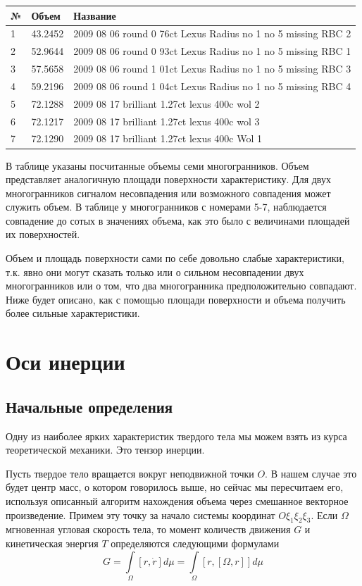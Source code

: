 \documentclass[a4paper,12pt, titlepage]{article}
\begin{document}
\begin{center}
\begin{tabular}{|p{0.5cm}|p{2.4cm}|p{12cm}|}
\hline
№ & Объем & Название\\
\hline
1 & 43.2452 & 2009 08 06 round 0 76ct Lexus Radius no 1 no 5 missing RBC 2\\
\hline
2 & 52.9644 & 2009 08 06 round 0 93ct Lexus Radius no 1 no 5 missing RBC 1\\
\hline
3 & 57.5658 & 2009 08 06 round 1 01ct Lexus Radius no 1 no 5 missing RBC 3\\
\hline
4 & 59.2196 & 2009 08 06 round 1 04ct Lexus Radius no 1 no 5 missing RBC 4\\
\hline
5 & 72.1288 & 2009 08 17 brilliant 1.27ct lexus 400c wol 2\\
\hline
6 & 72.1217 & 2009 08 17 brilliant 1.27ct lexus 400c wol 3\\
\hline
7 & 72.1290 & 2009 08 17 brilliant 1.27ct lexus 400c Wol 1\\
\hline  
\end{tabular}
\end{center}


В таблице указаны посчитанные объемы семи многогранников. Объем представляет аналогичную площади поверхности характеристику.
Для двух многогранников сигналом несовпадения или возможного совпадения может служить объем. В таблице у 
многогранников с номерами 5-7, наблюдается совпадение до сотых в значениях объема, как  это было с величинами 
площадей их поверхностей. 

Объем и площадь поверхности сами по себе довольно слабые характеристики, т.к. явно они могут сказать только или о сильном несовпадении двух многогранников или о том, что два многогранника предположительно совпадают. Ниже будет описано, как с помощью
площади поверхности и объема получить более сильные характеристики.

\newpage

\section{Оси инерции}
\subsection{Начальные определения}
Одну из наиболее ярких характеристик твердого тела мы можем взять из курса теоретической механики. 
Это тензор инерции\cite{vilke}. 

Пусть твердое тело вращается вокруг неподвижной точки $O$. В нашем случае это будет центр масс, о котором говорилось выше,
но сейчас мы пересчитаем его, используя описанный алгоритм нахождения объема через смешанное векторное произведение.
Примем эту точку за начало системы координат $O\xi_{1}\xi_{2}\xi_{3}$. Если $\Omega$ мгновенная угловая скорость тела,
то момент количеств движения $G$ и кинетическая энергия $T$ определяются следующими формулами
$$G = \int \limits_{\Omega}[r,\dot{r}]d\mu = \int \limits_{\Omega}[r,[\Omega,r]]d\mu$$  
\end{document}

